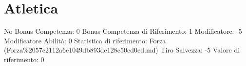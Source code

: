 \section{Atletica}\label{atletica}

\begin{description}
\tightlist
\item[Tags: ABI]
No Bonus Competenza: 0 Bonus Competenza di Riferimento: 1 Modificatore:
-5 Modificatore Abilità: 0 Statistica di riferimento: Forza
(Forza\%2057c2112a6e1049db893de128c50ed0ed.md) Tiro Salvezza: -5 Valore
di riferimento: 0
\end{description}

